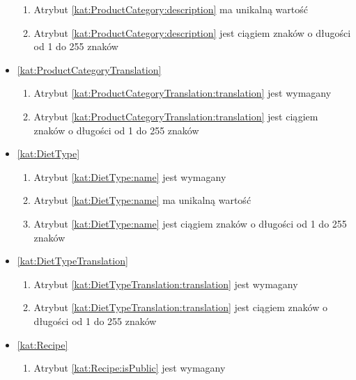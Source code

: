 \begin{itemize}[label={\textbf{Ograniczenia dla}}, wide, labelwidth=!, labelindent=0pt]
\begin{enumerate}[label={\textbf{OGR/\protect\threedigits{\arabic{enumi}}}}, wide, labelwidth=!, align=left, leftmargin=3cm, resume]
        \item Atrybut \ref{kat:ProductCategory:description} ma unikalną wartość

        \item Atrybut \ref{kat:ProductCategory:description} jest ciągiem znaków o długości od 1 do 255 znaków
    \end{enumerate}

    \item\ref{kat:ProductCategoryTranslation}
    \begin{enumerate}[label={\textbf{OGR/\protect\threedigits{\arabic{enumi}}}}, wide, labelwidth=!, align=left, leftmargin=3cm, resume]
        \item Atrybut \ref{kat:ProductCategoryTranslation:translation} jest wymagany

        \item Atrybut \ref{kat:ProductCategoryTranslation:translation} jest ciągiem znaków o długości od 1 do 255 znaków
    \end{enumerate}

    \item\ref{kat:DietType}
    \begin{enumerate}[label={\textbf{OGR/\protect\threedigits{\arabic{enumi}}}}, wide, labelwidth=!, align=left, leftmargin=3cm, resume]
        \item Atrybut \ref{kat:DietType:name} jest wymagany

        \item Atrybut \ref{kat:DietType:name} ma unikalną wartość

        \item Atrybut \ref{kat:DietType:name} jest ciągiem znaków o długości od 1 do 255 znaków
    \end{enumerate}

    \item\ref{kat:DietTypeTranslation}
    \begin{enumerate}[label={\textbf{OGR/\protect\threedigits{\arabic{enumi}}}}, wide, labelwidth=!, align=left, leftmargin=3cm, resume]
        \item Atrybut \ref{kat:DietTypeTranslation:translation} jest wymagany

        \item Atrybut \ref{kat:DietTypeTranslation:translation} jest ciągiem znaków o długości od 1 do 255 znaków
    \end{enumerate}

    \item\ref{kat:Recipe}
    \begin{enumerate}[label={\textbf{OGR/\protect\threedigits{\arabic{enumi}}}}, wide, labelwidth=!, align=left, leftmargin=3cm, resume]
        \item Atrybut \ref{kat:Recipe:isPublic} jest wymagany


\end{enumerate}
\end{itemize}
